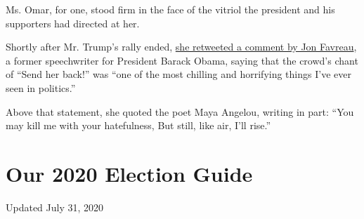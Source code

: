 Ms. Omar, for one, stood firm in the face of the vitriol the president
and his supporters had directed at her.

Shortly after Mr. Trump's rally ended,
\href{https://twitter.com/IlhanMN/status/1151656827106541569}{she
retweeted a comment by Jon Favreau}, a former speechwriter for President
Barack Obama, saying that the crowd's chant of ``Send her back!'' was
``one of the most chilling and horrifying things I've ever seen in
politics.''

Above that statement, she quoted the poet Maya Angelou, writing in part:
``You may kill me with your hatefulness, But still, like air, I'll
rise.''

\hypertarget{our-2020-election-guide}{%
\section{Our 2020 Election Guide}\label{our-2020-election-guide}}

Updated July 31, 2020

